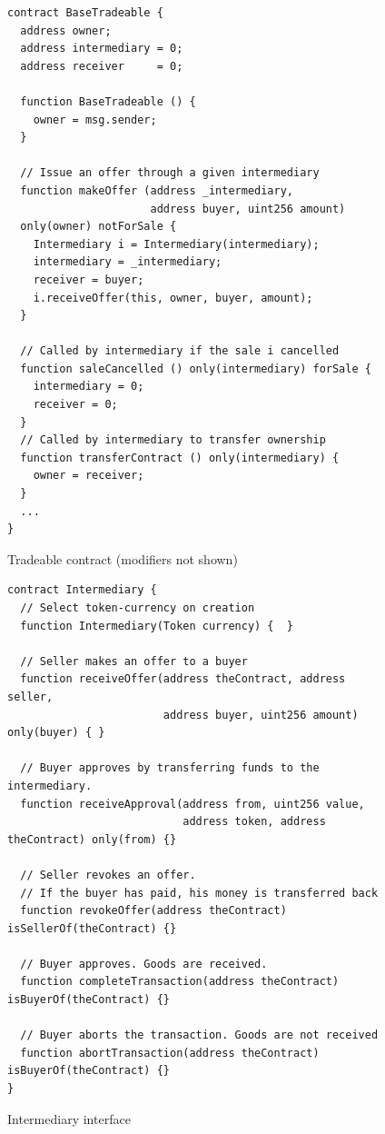 \documentclass[oneside,a4paper,10pts,article]{memoir}
\begin{document}
\begin{figure}
\begin{lstlisting}
contract BaseTradeable {
  address owner;
  address intermediary = 0;
  address receiver     = 0;

  function BaseTradeable () {
    owner = msg.sender;
  }

  // Issue an offer through a given intermediary  
  function makeOffer (address _intermediary,
                      address buyer, uint256 amount)
  only(owner) notForSale {
    Intermediary i = Intermediary(intermediary);
    intermediary = _intermediary;
    receiver = buyer;
    i.receiveOffer(this, owner, buyer, amount);
  }

  // Called by intermediary if the sale i cancelled
  function saleCancelled () only(intermediary) forSale {
    intermediary = 0;
    receiver = 0;
  }
  // Called by intermediary to transfer ownership
  function transferContract () only(intermediary) {
    owner = receiver;
  }
  ...
}
\end{lstlisting}

\caption{Tradeable contract (modifiers not shown)}
\label{fig:tradeable}
\end{figure}

\begin{figure}
  \begin{lstlisting}
contract Intermediary {
  // Select token-currency on creation
  function Intermediary(Token currency) {  }

  // Seller makes an offer to a buyer
  function receiveOffer(address theContract, address seller,
                        address buyer, uint256 amount) only(buyer) { }

  // Buyer approves by transferring funds to the intermediary.
  function receiveApproval(address from, uint256 value,
                           address token, address theContract) only(from) {}

  // Seller revokes an offer.
  // If the buyer has paid, his money is transferred back
  function revokeOffer(address theContract) isSellerOf(theContract) {}
  
  // Buyer approves. Goods are received.
  function completeTransaction(address theContract) isBuyerOf(theContract) {}

  // Buyer aborts the transaction. Goods are not received
  function abortTransaction(address theContract) isBuyerOf(theContract) {}
}
  \end{lstlisting}
  \caption{Intermediary interface}
  \label{fig:intermediary}
\end{figure}
\end{document}
